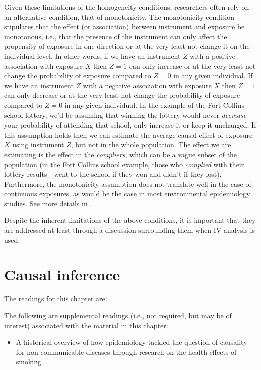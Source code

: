 \documentclass[
]{book}
\providecommand{\tightlist}{%
  \setlength{\itemsep}{0pt}\setlength{\parskip}{0pt}}
\begin{document}
Given these limitations of the homogeneity conditions, researchers often rely on an alternative condition, that of monotonicity. The monotonicity condition stipulates that the effect (or association) between instrument and exposure be monotonous, i.e., that the presence of the instrument can only affect the propensity of exposure in one direction or at the very least not change it on the individual level. In other words, if we have an instrument \(Z\) with a positive association with exposure \(X\) then \(Z=1\) can only increase or at the very least not change the probability of exposure compared to \(Z=0\) in any given individual. If we have an instrument \(Z\) with a negative association with exposure \(X\) then \(Z=1\) can only decrease or at the very least not change the probability of exposure compared to \(Z=0\) in any given individual. In the example of the Fort Collins school lottery, we'd be assuming that winning the lottery would never \emph{decrease} your probability of attending that school, only increase it or keep it unchanged. If this assumption holds then we can estimate the average causal effect of exposure \(X\) using instrument \(Z\), but not in the whole population. The effect we are estimating is the effect in the \emph{compliers}, which can be a vague subset of the population (in the Fort Collins school example, those who \emph{complied} with their lottery results---went to the school if they won and didn't if they lost). Furthermore, the monotonicity assumption does not translate well in the case of continuous exposures, as would be the case in most environmental epidemiology studies. See more details in \citet{hernanch16}.

Despite the inherent limitations of the above conditions, it is important that they are addressed at least through a discussion surrounding them when IV analysis is used.

\chapter{Causal inference}\label{causal-inference}

The readings for this chapter are:

The following are supplemental readings (i.e., not required, but may be of
interest) associated with the material in this chapter:

\begin{itemize}
\tightlist
\item
  \citet{samet2016epidemiology} A historical overview of how epidemiology tackled the question of causality for non-communicable diseases through research on the health effects of smoking
\end{itemize}

  
\end{document}
